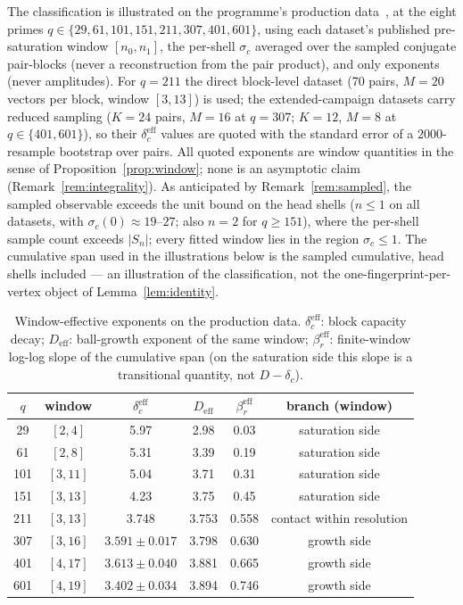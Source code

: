 \documentclass[11pt,a4paper]{article}
\theoremstyle{definition}
\newcommand{\dc}{\delta_c}
\begin{document}
The classification is illustrated on the programme's production data~\cite{Beau2026a29}, at the eight primes
$q \in \{29, 61, 101, 151, 211, 307, 401, 601\}$, using each dataset's published pre-saturation window
$[n_0, n_1]$, the per-shell $\sigma_c$ averaged over the sampled conjugate pair-blocks (never a
reconstruction from the pair product), and only exponents (never amplitudes).
For $q = 211$ the direct block-level dataset (70 pairs, $M = 20$ vectors per block, window $[3,13]$) is
used; the extended-campaign datasets carry reduced sampling ($K = 24$ pairs, $M = 16$ at $q = 307$;
$K = 12$, $M = 8$ at $q \in \{401, 601\}$), so their $\dc^{\mathrm{eff}}$ values are quoted with the
standard error of a $2000$-resample bootstrap over pairs.
All quoted exponents are window quantities in the sense of Proposition~\ref{prop:window}; none is an
asymptotic claim (Remark~\ref{rem:integrality}).
As anticipated by Remark~\ref{rem:sampled}, the sampled observable exceeds the unit bound on the head
shells ($n \le 1$ on all datasets, with $\sigma_c(0) \approx 19$--$27$; also $n = 2$ for $q \ge 151$),
where the per-shell sample count exceeds $|S_n|$; every fitted window lies in the region
$\sigma_c \le 1$.
The cumulative span used in the illustrations below is the sampled cumulative, head shells included ---
an illustration of the classification, not the one-fingerprint-per-vertex object of
Lemma~\ref{lem:identity}.

\begin{table}[ht]
  \centering
  \caption{Window-effective exponents on the production data.
    $\dc^{\mathrm{eff}}$: block capacity decay; $D_{\mathrm{eff}}$: ball-growth exponent of the same window;
    $\beta_r^{\mathrm{eff}}$: finite-window log-log slope of the cumulative span
    (on the saturation side this slope is a transitional quantity, not $D - \dc$).}
  \label{tab:windows}
  \begin{tabular}{cccccc}
    \toprule
    $q$ & window & $\dc^{\mathrm{eff}}$ & $D_{\mathrm{eff}}$ & $\beta_r^{\mathrm{eff}}$ & branch (window) \\
    \midrule
    29  & $[2,4]$  & 5.97 & 2.98 & 0.03 & saturation side \\
    61  & $[2,8]$  & 5.31 & 3.39 & 0.19 & saturation side \\
    101 & $[3,11]$ & 5.04 & 3.71 & 0.31 & saturation side \\
    151 & $[3,13]$ & 4.23 & 3.75 & 0.45 & saturation side \\
    211 & $[3,13]$ & 3.748 & 3.753 & 0.558 & contact within resolution \\
    307 & $[3,16]$ & $3.591 \pm 0.017$ & 3.798 & 0.630 & growth side \\
    401 & $[4,17]$ & $3.613 \pm 0.040$ & 3.881 & 0.665 & growth side \\
    601 & $[4,19]$ & $3.402 \pm 0.034$ & 3.894 & 0.746 & growth side \\
    \bottomrule
  \end{tabular}
\end{table}
\end{document}
